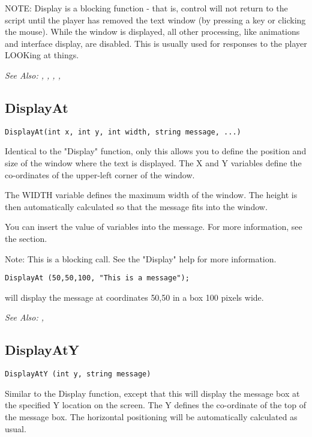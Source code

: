 NOTE: Display is a blocking function - that is, control will not return
to the script until the player has removed the text window (by pressing a
key or clicking the mouse). While the window is displayed, all other
processing, like animations and interface display, are disabled. This is
usually used for responses to the player LOOKing at things.

\it{See Also:} , ,
, ,


\subsection{DisplayAt}\label{DisplayAt}%

\begin{verbatim}
DisplayAt(int x, int y, int width, string message, ...)

\end{verbatim}
Identical to the "Display" function, only this allows you to define the
position and size of the window where the text is displayed. The X and Y
variables define the co-ordinates of the upper-left corner of the window.

The WIDTH variable defines the maximum width of the window. The height is then
automatically calculated so that the message fits into the window.

You can insert the value of variables into the message. For more information,
see the  section.

Note: This is a blocking call. See the "Display" help for more information.

\begin{verbatim}
DisplayAt (50,50,100, "This is a message");
\end{verbatim}
will display the message at coordinates 50,50 in a box 100 pixels wide.

\it{See Also:} , 

\subsection{DisplayAtY}\label{DisplayAtY}%

\begin{verbatim}
DisplayAtY (int y, string message)
\end{verbatim}
Similar to the Display function, except that this will display the message
box at the specified Y location on the screen. The Y defines the co-ordinate
of the top of the message box. The horizontal positioning will be
automatically calculated as usual.

